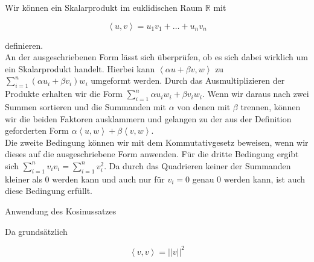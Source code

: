 Wir können ein Skalarprodukt im euklidischen Raum $\mathbb{R}$ mit

\begin{equation}
\left\langle u,v\right\rangle  = u_1 v_1 + \dots + u_n v_n
\label{skal}
\end{equation}

definieren.\\An der ausgeschriebenen Form lässt sich überprüfen, ob es sich dabei wirklich um ein Skalarprodukt handelt. Hierbei kann  $\left\langle \alpha u + \beta v, w\right\rangle $ zu $\sum\limits_{i=1}^n (\alpha u_i + \beta v_i)w_i$ umgeformt werden. Durch das Ausmultiplizieren der Produkte erhalten wir die Form $\sum\limits_{i=1}^n \alpha u_i w_i + \beta v_i w_i$. Wenn wir daraus nach zwei Summen sortieren und die Summanden mit $\alpha$ von denen mit $\beta$ trennen, können wir die beiden Faktoren ausklammern und gelangen zu der aus der Definition geforderten Form $\alpha \left\langle u,w\right\rangle  + \beta \left\langle v,w\right\rangle $.\\
Die zweite Bedingung können wir mit dem Kommutativgesetz beweisen, wenn wir dieses auf die ausgeschriebene Form anwenden.
Für die dritte Bedingung ergibt sich $\sum\limits_{i=1}^n v_i v_i = \sum\limits_{i=1}^n v_i^2$. Da durch das Quadrieren keiner der Summanden kleiner als 0 werden kann und auch nur für $v_i = 0$ genau 0 werden kann, ist auch diese Bedingung erfüllt.\\

\begin{dsafigure}
\centering
{}
\caption {Anwendung des Kosinussatzes}
\label{Kosinussatz}
\end{dsafigure}

Da grundsätzlich 

\begin{equation}
\left\langle v,v\right\rangle  = ||v||^2
\label{SkalNorm}
\end{equation}

